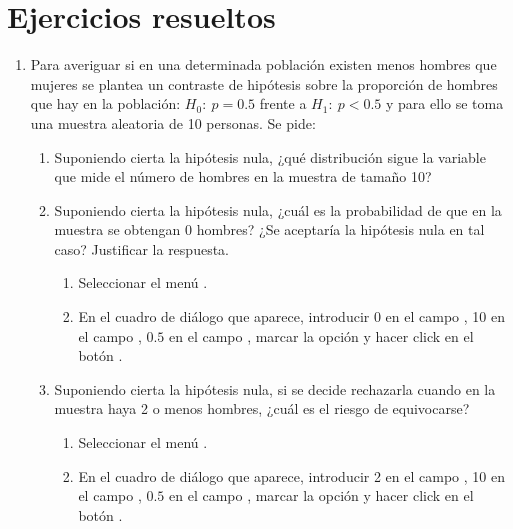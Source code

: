 \clearpage
\newpage

\section{Ejercicios resueltos}
\begin{enumerate}[leftmargin=*]
\item Para averiguar si en una determinada población existen menos hombres que mujeres se plantea un contraste de
hipótesis sobre la proporción de hombres que hay en la población: $H_0:\ p=0.5$ frente a $H_1:\ p<0.5$ y para ello se
toma una muestra aleatoria de 10 personas. 
Se pide:
\begin{enumerate}
\item Suponiendo cierta la hipótesis nula, ¿qué distribución sigue la variable que mide el número de hombres en la
muestra de tamaño 10?
\item Suponiendo cierta la hipótesis nula, ¿cuál es la probabilidad de que en la muestra se obtengan 0 hombres?
¿Se aceptaría la hipótesis nula en tal caso? 
Justificar la respuesta.
\begin{indicacion}
\begin{enumerate}
\item Seleccionar el menú .
\item En el cuadro de diálogo que aparece, introducir 0 en el campo , 10 en el campo
, $0.5$ en el campo , marcar la opción  y
hacer click en el botón .
\end{enumerate}
\end{indicacion}

\item Suponiendo cierta la hipótesis nula, si se decide rechazarla cuando en la muestra haya 2 o menos hombres, ¿cuál es
el riesgo de equivocarse?
\begin{indicacion}
\begin{enumerate}
\item Seleccionar el menú .
\item En el cuadro de diálogo que aparece, introducir 2 en el campo , 10 en el campo
, $0.5$ en el campo , marcar la opción  y
hacer click en el botón .
\end{enumerate}
\end{indicacion}


\end{enumerate}
\end{enumerate}
